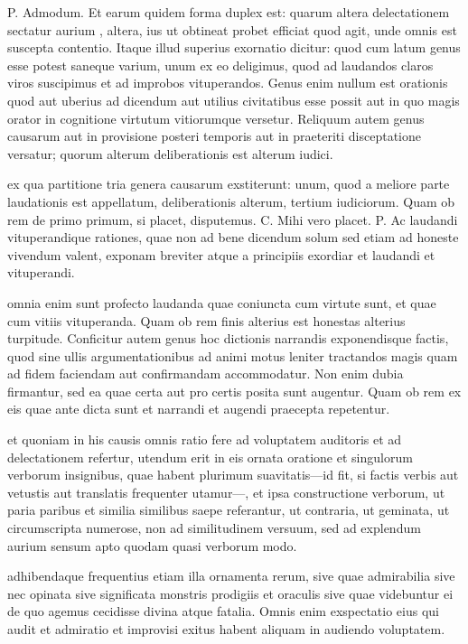  P. Admodum. Et earum quidem forma duplex est: quarum altera delectationem sectatur aurium , altera, ius ut obtineat probet efficiat quod agit, unde omnis est suscepta contentio. Itaque illud superius exornatio dicitur: quod cum latum genus esse potest saneque varium, unum ex eo deligimus, quod ad laudandos claros viros suscipimus et ad improbos vituperandos. Genus enim nullum est orationis quod aut uberius ad dicendum aut utilius civitatibus esse possit aut in quo magis orator in cognitione virtutum vitiorumque versetur. Reliquum autem genus causarum aut in provisione posteri temporis aut in praeteriti disceptatione versatur; quorum alterum deliberationis est alterum iudici.

 ex qua partitione tria genera causarum exstiterunt: unum, quod a meliore parte laudationis est appellatum, deliberationis alterum, tertium iudiciorum. Quam ob rem de primo primum, si placet, disputemus. C. Mihi vero placet. P. Ac laudandi vituperandique rationes, quae non ad bene dicendum solum sed etiam ad honeste vivendum valent, exponam breviter atque a principiis exordiar et laudandi et vituperandi.

 omnia enim sunt profecto laudanda quae coniuncta cum virtute sunt, et quae cum vitiis vituperanda. Quam ob rem finis alterius est honestas alterius turpitude. Conficitur autem genus hoc dictionis narrandis exponendisque factis, quod sine ullis argumentationibus ad animi motus leniter tractandos magis quam ad fidem faciendam aut confirmandam accommodatur. Non enim dubia firmantur, sed ea quae certa aut pro certis posita sunt augentur. Quam ob rem ex eis quae ante dicta sunt et narrandi et augendi praecepta repetentur.

 et quoniam in his causis omnis ratio fere ad voluptatem auditoris et ad delectationem refertur, utendum erit in eis ornata oratione et singulorum verborum insignibus, quae habent plurimum suavitatis—id fit, si factis verbis aut vetustis aut translatis frequenter utamur—, et ipsa constructione verborum, ut paria paribus et similia similibus saepe referantur, ut contraria, ut geminata, ut circumscripta numerose, non ad similitudinem versuum, sed ad explendum aurium sensum apto quodam quasi verborum modo.

 adhibendaque frequentius etiam illa ornamenta rerum, sive quae admirabilia sive nec opinata sive significata monstris prodigiis et oraculis sive quae videbuntur ei de quo agemus cecidisse divina atque fatalia. Omnis enim exspectatio eius qui audit et admiratio et improvisi exitus habent aliquam in audiendo voluptatem.

